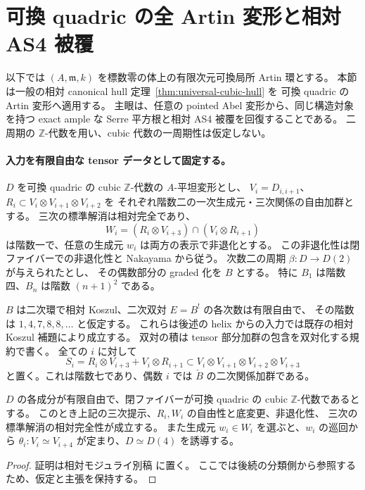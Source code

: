 \section{可換 quadric の全 Artin 変形と相対 AS4 被覆}
\label{sec:quadric-artin-hull}

以下では $(A,\mathfrak m,k)$ を標数零の体上の有限次元可換局所 Artin 環とする。
本節は一般の相対 canonical hull 定理~\ref{thm:universal-cubic-hull} を
可換 quadric の Artin 変形へ適用する。
主眼は、任意の pointed Abel 変形から、同じ構造対象を持つ exact ample な
Serre 平方根と相対 AS4 被覆を回復することである。
二周期の $\mathbb Z$-代数を用い、cubic 代数の一周期性は仮定しない。

\paragraph{入力を有限自由な tensor データとして固定する。}
$D$ を可換 quadric の cubic $\mathbb Z$-代数の $A$-平坦変形とし、
$V_i=D_{i,i+1}$、$R_i\subset V_i\otimes V_{i+1}\otimes V_{i+2}$ を
それぞれ階数二の一次生成元・三次関係の自由加群とする。
三次の標準解消は相対完全であり、
\[
 W_i=(R_i\otimes V_{i+3})\cap(V_i\otimes R_{i+1})
\]
は階数一で、任意の生成元 $w_i$ は両方の表示で非退化とする。
この非退化性は閉ファイバーでの非退化性と Nakayama から従う。
次数二の周期 $\beta:D\to D(2)$ が与えられたとし、
その偶数部分の graded 化を $B$ とする。
特に $B_1$ は階数四、$B_n$ は階数 $(n+1)^2$ である。

$B$ は二次環で相対 Koszul、二次双対 $E=B^!$ の各次数は有限自由で、
その階数は $1,4,7,8,8,\ldots$ と仮定する。
これらは後述の helix からの入力では既存の相対 Koszul 補題により成立する。
双対の積は tensor 部分加群の包含を双対化する規約で書く。
全ての $i$ に対して
\[
 S_i=R_i\otimes V_{i+3}+V_i\otimes R_{i+1}
 \subset V_i\otimes V_{i+1}\otimes V_{i+2}\otimes V_{i+3}
\]
と置く。これは階数七であり、偶数 $i$ では $\check B$ の二次関係加群である。

\begin{lemma}
\label{lem:relative-cubic-tensors-artin}
$D$ の各成分が有限自由で、閉ファイバーが可換 quadric の cubic
$\mathbb Z$-代数であるとする。
このとき上記の三次提示、$R_i,W_i$ の自由性と底変更、非退化性、
三次の標準解消の相対完全性が成立する。
また生成元 $w_i\in W_i$ を選ぶと、$w_i$ の巡回から
$\theta_i:V_i\simeq V_{i+4}$ が定まり、$D\simeq D(4)$ を誘導する。
\end{lemma}
\begin{proof}
証明は相対モジュライ別稿 \cite[\texttt{quadric_artin_hull} 節]{QuadricModuli2026} に置く。
ここでは後続の分類側から参照するため、仮定と主張を保持する。
\end{proof}


